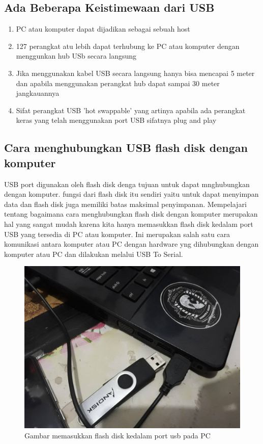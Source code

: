 \subsection {Ada Beberapa Keistimewaan dari USB}
\begin {enumerate}
\item
 PC atau komputer dapat dijadikan sebagai sebuah host
\item
 127 perangkat atu lebih dapat terhubung ke PC atau komputer dengan menggunkan hub USb secara langsung
\item
 Jika menggunakan kabel USB secara langsung hanya bisa mencapai 5 meter dan apabila menggunakan perangkat hub dapat sampai 30 meter jangkauannya
\item
 Sifat perangkat USB 'hot swappable' yang artinya apabila ada perangkat keras yang telah menggunakan port USB sifatnya plug and play
\end {enumerate}	

\subsection {Cara menghubungkan USB flash disk dengan komputer}
	USB port digunakan oleh flash disk denga tujuan untuk dapat mnghubungkan dengan komputer. fungsi dari flash disk itu sendiri yaitu untuk dapat menyimpan data dan flash disk juga memiliki batas maksimal penyimpanan. Mempelajari tentang bagaimana cara menghubungkan flash disk dengan komputer merupakan hal yang sangat mudah karena kita hanya memasukkan flash disk kedalam port USB yang tersedia di PC atau komputer. Ini merupakan salah satu cara komunikasi antara komputer atau PC dengan hardware yng dihubungkan dengan komputer atau PC dan dilakukan melalui USB To Serial.
	
	\begin{figure}[ht]
	\centerline{\includegraphics[width=1\textwidth]{figures/usb1.jpg}}
	\caption{Gambar memasukkan flash disk kedalam port usb pada PC}
	\label{Gambar}
	\end{figure}
      
